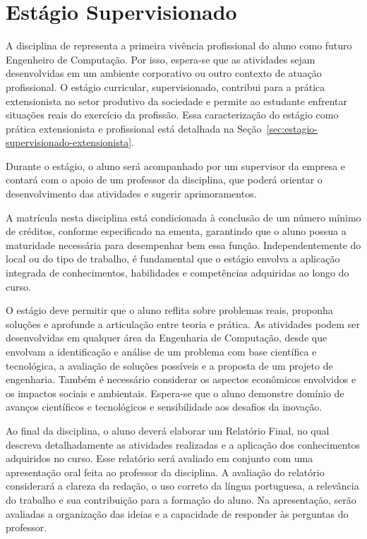 \FloatBarrier %



\section{Estágio Supervisionado}

A disciplina de \textbf{\EstSup} representa a primeira vivência profissional do aluno como futuro Engenheiro de Computação. Por isso, espera-se que as atividades sejam desenvolvidas em um ambiente corporativo ou outro contexto de atuação profissional. O estágio curricular, supervisionado, contribui para a prática extensionista no setor produtivo da sociedade e permite ao estudante enfrentar situações reais do exercício da profissão. Essa caracterização do estágio como prática extensionista e profissional está detalhada na Seção~\ref{sec:estagio-supervisionado-extensionista}.

Durante o estágio, o aluno será acompanhado por um supervisor da empresa e contará com o apoio de um professor da disciplina, que poderá orientar o desenvolvimento das atividades e sugerir aprimoramentos.

A matrícula nesta disciplina está condicionada à conclusão de um número mínimo de créditos, conforme especificado na ementa, garantindo que o aluno possua a maturidade necessária para desempenhar bem essa função. Independentemente do local ou do tipo de trabalho, é fundamental que o estágio envolva a aplicação integrada de conhecimentos, habilidades e competências adquiridas ao longo do curso.

O estágio deve permitir que o aluno reflita sobre problemas reais, proponha soluções e aprofunde a articulação entre teoria e prática. As atividades podem ser desenvolvidas em qualquer área da Engenharia de Computação, desde que envolvam a identificação e análise de um problema com base científica e tecnológica, a avaliação de soluções possíveis e a proposta de um projeto de engenharia. Também é necessário considerar os aspectos econômicos envolvidos e os impactos sociais e ambientais. Espera-se que o aluno demonstre domínio de avanços científicos e tecnológicos e sensibilidade aos desafios da inovação.

Ao final da disciplina, o aluno deverá elaborar um Relatório Final, no qual descreva detalhadamente as atividades realizadas e a aplicação dos conhecimentos adquiridos no curso. Esse relatório será avaliado em conjunto com uma apresentação oral feita ao professor da disciplina. A avaliação do relatório considerará a clareza da redação, o uso correto da língua portuguesa, a relevância do trabalho e sua contribuição para a formação do aluno. Na apresentação, serão avaliadas a organização das ideias e a capacidade de responder às perguntas do professor.

